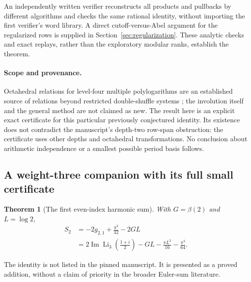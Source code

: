 \documentclass[11pt]{article}
\numberwithin{equation}{section}
\theoremstyle{plain}
\newtheorem{theorem}{Theorem}[section]
\theoremstyle{definition}
\theoremstyle{remark}
\begin{document}
An independently written verifier reconstructs all products and
pullbacks by different algorithms and checks the same rational identity,
without importing the first verifier's word library.  A direct
cutoff-versus-Abel argument for the regularized rows is supplied in Section~\ref{sec:regularization}.  These analytic checks and exact replays,
rather than the exploratory modular ranks, establish the theorem.

\paragraph{Scope and provenance.}
Octahedral relations for level-four multiple polylogarithms are an
established source of relations beyond restricted double-shuffle
systems \cite{ZhaoOctahedral,Au}; the involution itself and the general method are not claimed
as new.  The result here is an explicit exact certificate for this
particular previously conjectured identity.  Its existence does not
contradict the manuscript's depth-two row-span obstruction: the
certificate uses other depths and octahedral transformations.  No
conclusion about arithmetic independence or a smallest possible period
basis follows.


\subsection{A weight-three companion with its full small certificate}

\begin{theorem}[The first even-index harmonic sum]\label{thm:S2}
With $G=\beta(2)$ and $L=\log2$,
\begin{align*}
 S_2&=-2g_{2,1}+\frac{\pi^3}{32}-2GL\\
 &=2\operatorname{Im}\operatorname{Li}_3\!\left(\frac{1+i}{2}\right)
 -GL-\frac{\pi L^2}{16}-\frac{\pi^3}{64}.
\end{align*}
\end{theorem}

The identity is not listed in the pinned manuscript.  It is presented
as a proved addition, without a claim of priority in the broader
Euler-sum literature.
\end{document}
